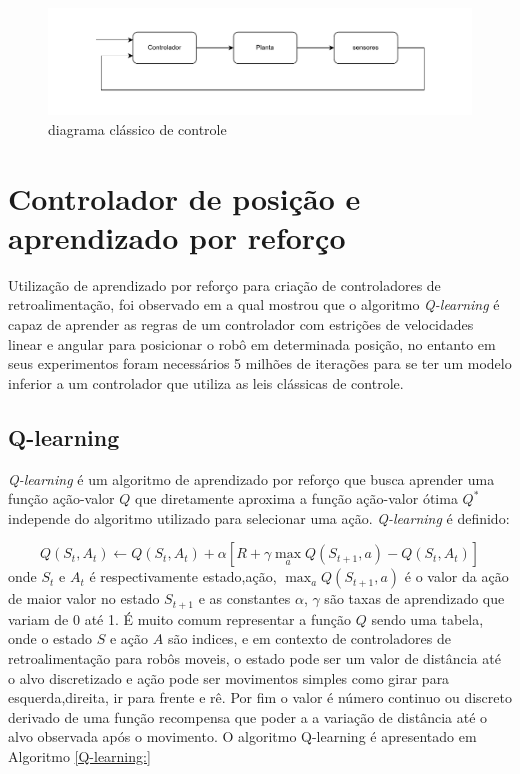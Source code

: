 \begin{figure}[H]
    \centering
    \includegraphics[scale=0.6]{figuras/sistema_classico_controle.pdf}
    \caption{diagrama clássico de controle}
\end{figure}

\section{Controlador de posição e aprendizado por reforço }

Utilização de aprendizado por reforço para criação de controladores
de retroalimentação, foi observado em \cite{farias2020position}
a qual mostrou que o algoritmo \textit{Q-learning} é capaz de aprender
as regras de um controlador com estrições de velocidades linear e angular
para  posicionar o robô em determinada posição, no entanto em seus
experimentos foram necessários 5 milhões de iterações para se ter um modelo
inferior a um controlador que utiliza as leis clássicas de controle.

\subsection{Q-learning}
\textit{Q-learning} é um algoritmo de aprendizado por reforço que
busca aprender uma função ação-valor $Q$ que diretamente aproxima
a função ação-valor ótima $Q^*$ independe do algoritmo utilizado
para selecionar uma ação. \textit{Q-learning} é definido:

\begin{equation} 
    Q(S_t,A_t) \leftarrow Q(S_t,A_t) + \alpha[R + \gamma  \max_aQ(S_{t +1},a) - Q(S_t,A_t)]
\end{equation}
onde $S_t$ e $A_t$ é respectivamente estado,ação,  $ \max_a Q(S_{t +1},a)$ é o valor da
ação de maior valor no estado $S_{t+1}$ e as constantes $\alpha$, $\gamma$ são taxas
de aprendizado que variam de 0 até 1. É muito comum representar a função $Q$
sendo uma tabela, onde o estado $S$ e ação $A$ são indices, e em contexto de
controladores de retroalimentação para robôs moveis, o estado pode ser um
valor de distância até o alvo discretizado e ação pode ser movimentos simples
como girar para esquerda,direita, ir para frente e rê. Por fim o valor é
número continuo ou discreto derivado de uma função recompensa que poder
a a variação de distância até o alvo observada após o movimento. O algoritmo
Q-learning é apresentado em Algoritmo  \ref{Q-learning:}


